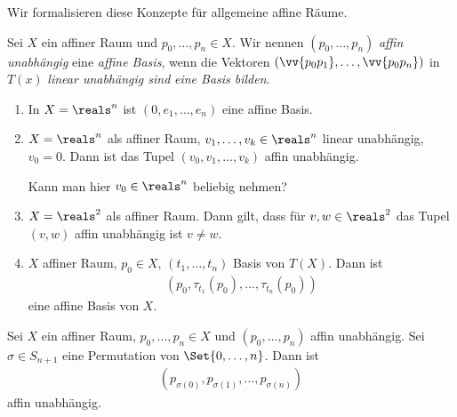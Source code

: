 Wir formalisieren diese Konzepte für allgemeine affine Räume.
\begin{definition*}
    Sei \( X \) ein affiner Raum und \( p_0,\dotsc, p_n\in X \). Wir nennen \( (p_0,\dotsc,p_n) \) \emph{affin unabhängig} \bzw eine \emph{affine Basis}, wenn die Vektoren \( (\vv{p_0p_1},\dotsc, \vv{p_0p_n}) \) in \( T(x) \) \emph{linear unabhängig sind} \bzw \emph{eine Basis bilden}.
\end{definition*}
\begin{beispiele*}
    \begin{enumerate}
        \item In \( X=\reals^n \) ist \( (0,e_1,\dotsc, e_n) \) eine affine Basis.
        \item \( X=\reals^n \) als affiner Raum, \( v_1,\dotsc, v_k\in \reals^n \) linear unabhängig, \( v_0=0 \). Dann ist das Tupel \( (v_0,v_1,\dotsc,v_k) \) affin unabhängig.
        \begin{frage*}
            Kann man hier \( v_0\in \reals^n \) beliebig nehmen?
        \end{frage*}
        \item \( X=\reals^2 \) als affiner Raum. Dann gilt, dass für \( v,w\in \reals^2 \) das Tupel \( (v,w) \) affin unabhängig ist \gdw \( v\neq w \).
        \item \( X \) affiner Raum, \( p_0\in X \), \( (t_1,\dotsc,t_n) \) Basis von \( T(X) \). Dann ist
        \begin{align*}
            (p_0,\tau_{t_1}(p_0),\dotsc, \tau_{t_n}(p_0))
        \end{align*}
        eine affine Basis von \( X \).
    \end{enumerate}
    
\end{beispiele*}
\begin{lemma}
    Sei \( X \) ein affiner Raum, \( p_0,\dotsc, p_n\in X \) und \( (p_0,\dotsc, p_n) \) affin unabhängig. Sei \( \sigma\in S_{n+1} \) eine Permutation von \( \Set{0,\dotsc,n} \). Dann ist
    \begin{align*}
        (p_{\sigma(0)},p_{\sigma(1)},\dotsc,p_{\sigma(n)})
    \end{align*}
    affin unabhängig.
\end{lemma}
